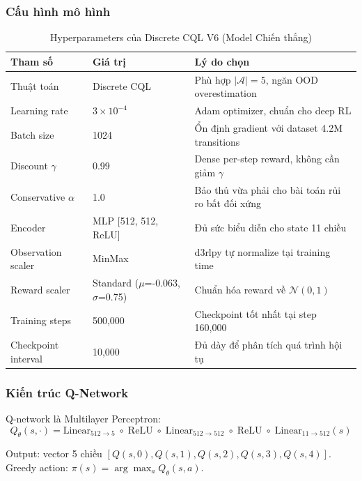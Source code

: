 \subsubsection{Cấu hình mô hình}

\begin{table}[H]
\centering
\caption{Hyperparameters của Discrete CQL V6 (Model Chiến thắng)}
\begin{tabular}{lll}
\hline
\textbf{Tham số} & \textbf{Giá trị} & \textbf{Lý do chọn} \\
\hline
Thuật toán & Discrete CQL & Phù hợp $|\mathcal{A}|=5$, ngăn OOD overestimation \\
Learning rate & $3\times10^{-4}$ & Adam optimizer, chuẩn cho deep RL \\
Batch size & 1024 & Ổn định gradient với dataset 4.2M transitions \\
Discount $\gamma$ & 0.99 & Dense per-step reward, không cần giảm $\gamma$ \\
Conservative $\alpha$ & 1.0 & Bảo thủ vừa phải cho bài toán rủi ro bất đối xứng \\
Encoder & MLP [512, 512, ReLU] & Đủ sức biểu diễn cho state 11 chiều \\
Observation scaler & MinMax & d3rlpy tự normalize tại training time \\
Reward scaler & Standard ($\mu$=-0.063, $\sigma$=0.75) & Chuẩn hóa reward về $\mathcal{N}(0,1)$ \\
Training steps & 500,000 & Checkpoint tốt nhất tại step 160,000 \\
Checkpoint interval & 10,000 & Đủ dày để phân tích quá trình hội tụ \\
\hline
\end{tabular}
\label{tab:hyperparams}
\end{table}

\subsubsection{Kiến trúc Q-Network}

Q-network là Multilayer Perceptron:
\begin{equation}
    Q_\theta(s, \cdot) = \text{Linear}_{512\to5}\;\circ\;\text{ReLU}\;\circ\;\text{Linear}_{512\to512}\;\circ\;\text{ReLU}\;\circ\;\text{Linear}_{11\to512}(s)
    \label{eq:qnet}
\end{equation}

Output: vector 5 chiều $[Q(s,0), Q(s,1), Q(s,2), Q(s,3), Q(s,4)]$. Greedy action: $\pi(s) = \arg\max_a Q_\theta(s,a)$.

